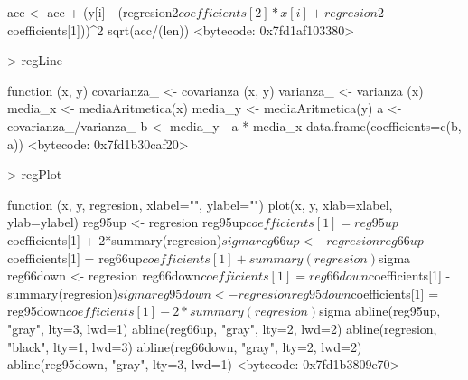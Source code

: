 \documentclass [a4paper] {article}
\begin{document}
\begin{Schunk}
\begin{Soutput}
{{    acc <- acc + (y[i] - (regresion2$coefficients[2]*x[i]+regresion2$coefficients[1]))^2
  }
  sqrt(acc/(len))
}
<bytecode: 0x7fd1af103380>
\end{Soutput}
\begin{Sinput}
> regLine
\end{Sinput}
\begin{Soutput}
function (x, y) {
  covarianza_ <- covarianza (x, y)
  varianza_ <- varianza (x)
  media_x <- mediaAritmetica(x)
  media_y <- mediaAritmetica(y)
  a <- covarianza_/varianza_
  b <- media_y - a * media_x
  data.frame(coefficients=c(b, a))
}
<bytecode: 0x7fd1b30caf20>
\end{Soutput}
\begin{Sinput}
> regPlot
\end{Sinput}
\begin{Soutput}
function (x, y, regresion, xlabel="", ylabel="") {
  plot(x, y, xlab=xlabel, ylab=ylabel)
  reg95up <- regresion
  reg95up$coefficients[1] = reg95up$coefficients[1] + 2*summary(regresion)$sigma
  reg66up <- regresion
  reg66up$coefficients[1] = reg66up$coefficients[1] + summary(regresion)$sigma
  reg66down <- regresion
  reg66down$coefficients[1] = reg66down$coefficients[1] - summary(regresion)$sigma
  reg95down <- regresion
  reg95down$coefficients[1] = reg95down$coefficients[1] - 2*summary(regresion)$sigma
  abline(reg95up, "gray", lty=3, lwd=1)
  abline(reg66up, "gray", lty=2, lwd=2)
  abline(regresion, "black", lty=1, lwd=3)
  abline(reg66down, "gray", lty=2, lwd=2)
  abline(reg95down, "gray", lty=3, lwd=1)
}
<bytecode: 0x7fd1b3809e70>
\end{Soutput}
\end{Schunk}
\end{document}
